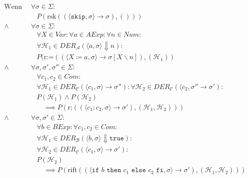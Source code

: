 				    \begin{align*}
					    \text{Wenn gilt:} & \,\forall \sigma \in \Sigma : \tag{Zustände} \\
						    &\quad P(\text{rsk}((\langle \texttt{skip}, \sigma \rangle \rightarrow \sigma), ())) \tag{Konklusion} \\
						\land & \,\forall \sigma \in \Sigma : \tag{Zustände} \\
							&\quad \forall X \in \textit{Var} : \forall a \in \textit{AExp} : \forall n \in \textit{Num} : \tag{Ausdrucksbestandteile} \\
							&\quad \forall \mathcal{H} _ 1 \in \textit{DER} _ \mathcal{A} (\langle a, \sigma \rangle \Downarrow n) : \tag{Kalkülfremde Herleitungen} \\
							&\quad P(\text{r:=}((\langle X \coloneqq a, \sigma \rangle \rightarrow \sigma[X \backslash n]), (\mathcal{H} _ 1)) \tag{Konklusion} \\
						\land & \,\forall \sigma, \sigma', \sigma'' \in \Sigma : \tag{Zustände} \\
							&\quad \forall c _ 1, c _ 2 \in \textit{Com} : \tag{Ausdrucksbestandteile} \\
							&\quad \forall \mathcal{H} _ 1 \in \textit{DER} _ \mathcal{C} (\langle c _ 1, \sigma \rangle \rightarrow \sigma'') : \forall \mathcal{H} _ 2 \in \textit{DER} _ \mathcal{C} (\langle c _ 2, \sigma'' \rightarrow \sigma') : \tag{Herleitungen in Prämisse} \\
							&\quad P(\mathcal{H} _ 1) \land P(\mathcal{H} _ 2) \tag{Prämisse} \\
							&\quad\quad \implies P(\text{r;}((\langle c _ 1 ; c _ 2, \sigma \rangle \rightarrow \sigma'), (\mathcal{H} _ 1, \mathcal{H} _ 2))) \tag{Konklusion} \\
						\land & \,\forall \sigma, \sigma' \in \Sigma : \tag{Zustände} \\
							&\quad \forall b \in \textit{BExp} : \forall c _ 1, c _ 2 \in \textit{Com} : \tag{Ausdrucksbestandteile} \\
							&\quad \forall \mathcal{H} _ 1 \in \textit{DER} _ \mathcal{B} (\langle b, \sigma \rangle \Downarrow \texttt{true}) : \tag{Kalkülfremde Herleitungen} \\
							&\quad \forall \mathcal{H} _ 2 \in \textit{DER} _ \mathcal{C} (\langle c _ 1, \sigma \rangle \rightarrow \sigma') : \tag{Herleitungen in Prämisse} \\
							&\quad P(\mathcal{H} _ 2) \tag{Prämisse} \\
							&\quad\quad \implies P(\text{rift}((\langle \texttt{if } b \texttt{ then } c _ 1 \texttt{ else } c _ 2 \texttt{ fi}, \sigma \rangle \rightarrow \sigma'), (\mathcal{H} _ 1, \mathcal{H} _ 2))) \tag{Konklusion} \\

\end{align*}

